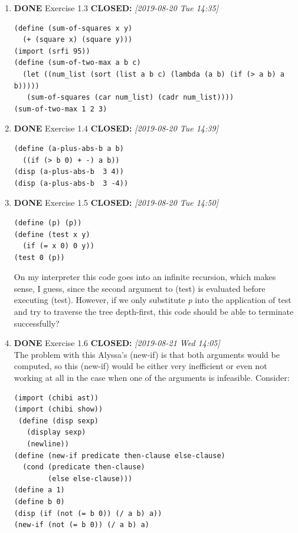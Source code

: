 \documentclass[11pt]{article}
\begin{document}
\begin{enumerate}
\begin{enumerate}
\item {\bfseries\sffamily DONE} Exercise 1.3
\label{sec:orga2f8494}
\noindent\textbf{CLOSED:} \textit{[2019-08-20 Tue 14:35]}\\
\lstset{language=Lisp,label= ,caption= ,captionpos=b,numbers=none}
\begin{lstlisting}
(define (sum-of-squares x y)
  (+ (square x) (square y)))
(import (srfi 95))
(define (sum-of-two-max a b c)
  (let ((num_list (sort (list a b c) (lambda (a b) (if (> a b) a b)))))
   (sum-of-squares (car num_list) (cadr num_list))))
(sum-of-two-max 1 2 3)
\end{lstlisting}

\item {\bfseries\sffamily DONE} Exercise 1.4
\label{sec:org417bff1}
\noindent\textbf{CLOSED:} \textit{[2019-08-20 Tue 14:39]}\\
\lstset{language=Lisp,label= ,caption= ,captionpos=b,numbers=none}
\begin{lstlisting}
(define (a-plus-abs-b a b)
  ((if (> b 0) + -) a b))
(disp (a-plus-abs-b  3 4))
(disp (a-plus-abs-b  3 -4))
\end{lstlisting}

\item {\bfseries\sffamily DONE} Exercise 1.5
\label{sec:orge21ba0a}
\noindent\textbf{CLOSED:} \textit{[2019-08-20 Tue 14:50]}\\
\lstset{language=Lisp,label= ,caption= ,captionpos=b,numbers=none}
\begin{lstlisting}
(define (p) (p))
(define (test x y)
  (if (= x 0) 0 y))
(test 0 (p))
\end{lstlisting}

On my interpreter this code goes into an infinite recursion, which
makes sense, I guess, since the second argument to (test) is evaluated
before executing (test). However, if we only substitute \emph{p} into the
application of test and try to traverse the tree depth-first, this
code should be able to terminate successfully?

\item {\bfseries\sffamily DONE} Exercise 1.6
\label{sec:orgbde19b1}
\noindent\textbf{CLOSED:} \textit{[2019-08-21 Wed 14:05]}\\
The problem with this Alyssa's (new-if) is that both arguments would
be computed, so this (new-if) would be either very inefficient or even
not working at all in the case when one of the arguments is
infeasible.
Consider:

\lstset{language=Lisp,label= ,caption= ,captionpos=b,numbers=none}
\begin{lstlisting}
(import (chibi ast))
(import (chibi show))
 (define (disp sexp)
   (display sexp)
   (newline))
(define (new-if predicate then-clause else-clause)
  (cond (predicate then-clause)
        (else else-clause)))
(define a 1)
(define b 0)
(disp (if (not (= b 0)) (/ a b) a))
(new-if (not (= b 0)) (/ a b) a)
\end{lstlisting}


\end{enumerate}
\end{enumerate}
\end{document}
